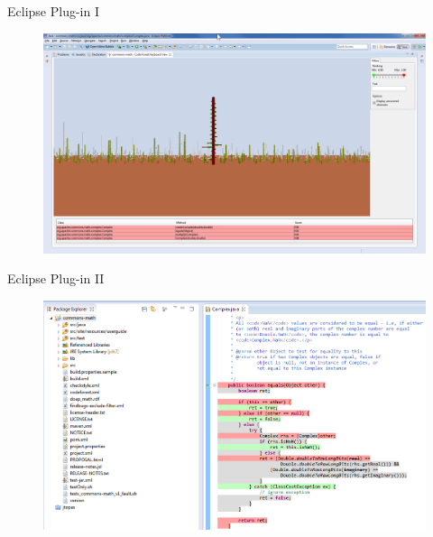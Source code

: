 \documentclass[handout]{beamer}
\begin{document}
\begin{frame}{Eclipse Plug-in I}
    \begin{figure}
        \centering
        \includegraphics[width=\linewidth]{../figures/commons_math_complex_04_view_max}
    \end{figure}
\end{frame}

\begin{frame}{Eclipse Plug-in II}
    \begin{figure}
        \centering
        \includegraphics[width=\linewidth]{../figures/commons_math_complex_02_red_green_grey}
    \end{figure}
\end{frame}
\end{document}
